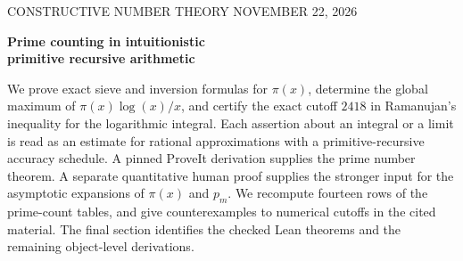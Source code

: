 \documentclass[10pt,letterpaper]{article}
\theoremstyle{remark}\newtheorem{remark}[theorem]{Remark}
\numberwithin{equation}{section}
\begin{document}
\thispagestyle{empty}
{\noindent\color{accent}\sffamily\small CONSTRUCTIVE NUMBER THEORY \hfill NOVEMBER 22, 2026\par}
\vspace{9pt}
{\noindent\fontsize{25}{29}\selectfont\bfseries\color{ink}Prime counting in intuitionistic\\primitive recursive arithmetic\par}
\vspace{8pt}
\noindent We prove exact sieve and inversion formulas for $\pi(x)$, determine the global maximum of $\pi(x)\log(x)/x$, and certify the exact cutoff $2418$ in Ramanujan's inequality for the logarithmic integral. Each assertion about an integral or a limit is read as an estimate for rational approximations with a primitive-recursive accuracy schedule. A pinned ProveIt derivation supplies the prime number theorem. A separate quantitative human proof supplies the stronger input for the asymptotic expansions of $\pi(x)$ and $p_m$. We recompute fourteen rows of the prime-count tables, and give counterexamples to numerical cutoffs in the cited material. The final section identifies the checked Lean theorems and the remaining object-level derivations.
\smallskip
\begingroup\small\setlength{\parskip}{0pt}\tableofcontents\endgroup
\newpage











\end{document}
